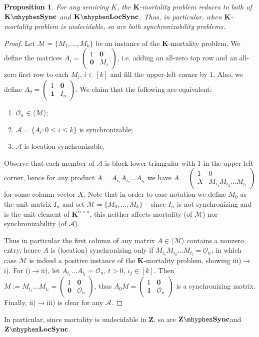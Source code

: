 \documentclass[submission,copyright,creativecommons]{eptcs}
\def\bK{{\mathbf{K}}}
\def\bZ{{\mathbf{Z}}}
\theoremstyle{plain}
\newtheorem{proposition}{Proposition}
\theoremstyle{definition}
\theoremstyle{remark}
\begin{document}
\begin{proposition}
For any semiring $K$, the $\bK$-mortality problem reduces to both of $\bK\mhyphen\mathbf{Sync}$
and $\bK\mhyphen\mathbf{LocSync}$.
Thus, in particular, when $\bK$-mortality problem is undecidable, so are both synchronizability problems.
\end{proposition}
\begin{proof}
Let $\mathcal{M}=\{M_1,\ldots,M_k\}$ be an instance of the $\bK$-mortality problem.
We define the matrices $A_i=\left(\begin{array}{ll}1&\mathbf{0}\\\mathbf{0}&M_i\end{array}\right)$, i.e. adding an all-zero top row and an all-zero
first row to each $M_i$, $i\in[k]$ and fill the upper-left corner by $1$. Also, we define $A_0=\left(\begin{array}{ll}1&\mathbf{0}\\\mathbf{1}&I_n\end{array}\right)$. We claim that the following are equivalent:
\begin{enumerate}
\item $\mathcal{O}_n\in\langle \mathcal{M}\rangle$;
\item $\mathcal{A}=\{A_i:0\leq i\leq k\}$ is synchronizable;
\item $\mathcal{A}$ is location synchronizable.
\end{enumerate}
Observe that each member of $\mathcal{A}$ is block-lower triangular with $1$ in the upper left corner, hence for any product
$A=A_{i_1}A_{i_2}\ldots A_{i_t}$ we have $A=\left(\begin{array}{ll}1&0\\X&M_{i_1}M_{i_2}\ldots M_{i_t}\end{array}\right)$ for some column vector $X$.
Note that in order to ease notation we define $M_0$ as the unit matrix $I_n$ and set $\mathcal{M}=\{M_0,\ldots,M_k\}$ -- since $I_n$ is not
synchronizing and is the unit element of $\bK^{n\times n}$, this neither affects mortality (of $\mathcal{M}$) nor synchronizability
(of $\mathcal{A}$).

Thus in particular the first column of any matrix $A\in\langle\mathcal{M}\rangle$ contains a nonzero entry, hence $A$ is (location) synchronizing
only if $M_{i_1}M_{i_2}\ldots M_{i_t}=\mathcal{O}_n$, in which case $\mathcal{M}$ is indeed a positive instance of the $\bK$-mortality problem,
showing iii)$\to$ i). For i)$\to$ii), let $A_{i_1}\ldots A_{i_t}=\mathcal{O}_n$, $t>0$, $i_j\in[k]$. Then $M:=M_{i_1}\ldots M_{i_t}=\left(\begin{array}{ll}1&\mathbf{0}\\\mathbf{0}&\mathcal{O}_n\end{array}\right)$, thus $A_0M=\left(\begin{array}{ll}1&\mathbf{0}\\\mathbf{1}&\mathcal{O}_n\end{array}\right)$ is a synchronizing matrix. Finally, ii)$\to$iii) is clear for any $\mathcal{A}$.
\end{proof}
In particular, since mortality is undecidable in $\bZ$, so are $\bZ\mhyphen\mathbf{Sync}$and $\bZ\mhyphen\mathbf{LocSync}$.
\end{document}

